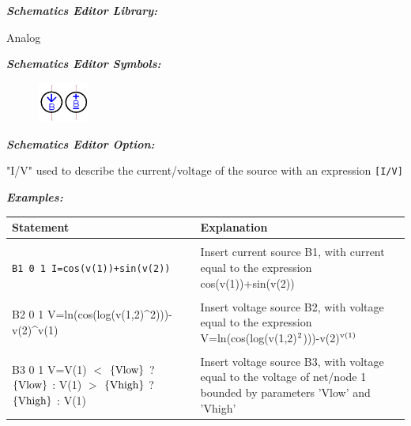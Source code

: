 \textbf{\textit{Schematics Editor Library:}}

Analog

\textbf{\textit{Schematics Editor Symbols:}}

\begin{figure}[htb]
  \begin{center}
    \includegraphics[width=0.15\textwidth]{./pics/SpiceEl/BSource.png}
  \end{center}
\end{figure}

\textbf{\textit{Schematics Editor Option:}}

"\textsf{I/V}" used to describe the current/voltage of the source with an expression \texttt{[I/V]}

\textbf{\textit{Examples:}}

\begin{longtable}{l l}
Statement & Explanation \\ [0.5ex]
\hline \\ %

\begin{minipage}{15em}
\texttt{B1 0 1 I=cos(v(1))+sin(v(2))}
\end{minipage}& 
\begin{minipage}{20em}
Insert current source B1, with current equal to the expression cos(v(1))+sin(v(2))
\end{minipage}
\\ \\

\begin{minipage}{15em}
B2 0 1 V=ln(cos(log(v(1,2)\^{}2)))-v(2)\^{}v(1)
\end{minipage} &
\begin{minipage}{20em}
Insert voltage source B2, with voltage equal to the expression V=ln(cos(log(v(1,2)$\rm{^2}$)))-v(2)$\rm{^{v(1)}}$
\end{minipage}
\\ \\

\begin{minipage}{15em}
B3 0 1 V=V(1) $<$ $\left\{\rm{Vlow}\right\}$ ? $\left\{\rm{Vlow}\right\}$ : V(1) $>$ $\left\{\rm{Vhigh}\right\}$ ? $\left\{\rm{Vhigh}\right\}$ : V(1)
\end{minipage} &
\begin{minipage}{20em}
Insert voltage source B3, with voltage equal to the voltage of net/node 1 bounded by parameters 'Vlow' and 'Vhigh'
\end{minipage}

\end{longtable}

